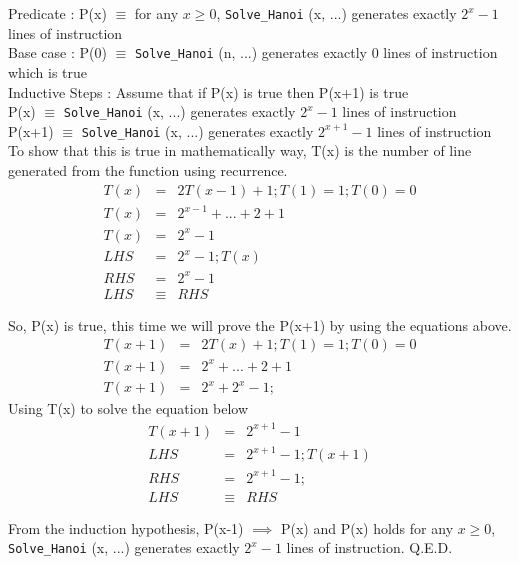 \documentclass[a4paper, 11pt]{article}
\begin{document}
	Predicate : P(x) $\equiv$ for any $x \geq 0$, \texttt{Solve\_Hanoi} (x, ...) generates exactly $2^x-1$ lines of instruction\\
	
	Base case : P(0) $\equiv$ \texttt{Solve\_Hanoi} (n, ...) generates exactly 0 lines of instruction which is true\\
	
	Inductive Steps : Assume that if P(x) is true then P(x+1) is true\\
	P(x)  $\equiv$ \texttt{Solve\_Hanoi} (x, ...) generates exactly $2^x-1$ lines of instruction\\
	P(x+1)  $\equiv$ \texttt{Solve\_Hanoi} (x, ...) generates exactly $2^{x+1}-1$ lines of instruction\\ %
	
	
	To show that this is true in mathematically way, T(x) is the number of line generated from the function using recurrence.
	\begin{eqnarray}
	T(x) &=& 2T(x-1)+1; T(1) = 1; T(0) = 0\\
	T(x) &=& 2^{x-1} + ... + 2 + 1\\
	T(x) &=& 2^x - 1\\
	LHS &=& 2^x - 1;T(x)\\
	RHS &=& 2^x - 1\\
	LHS &\equiv& RHS
	\end{eqnarray}
	
	So, P(x) is true, this time we will prove the P(x+1) by using the equations above.
	\begin{eqnarray}
	T(x+1) &=& 2T(x)+1; T(1) = 1; T(0) = 0\\
	T(x+1) &=& 2^{x} + ... + 2 + 1\\
	T(x+1) &=& 2^{x} + 2^x - 1;
	\end{eqnarray} 
	Using T(x) to solve the equation below\\
	\begin{eqnarray}
	T(x+1) &=& 2^{x+1} - 1\\
	LHS &=& 2^{x+1} - 1;T(x+1)\\
	RHS &=& 2^{x+1} - 1;\\
	LHS &\equiv& RHS
	\end{eqnarray}
	
	From the induction hypothesis, P(x-1) $\implies$ P(x) and P(x) holds for any $x \geq 0$, \texttt{Solve\_Hanoi} (x, ...) generates exactly $2^x-1$ lines of instruction. Q.E.D.\\
	
\end{document}
